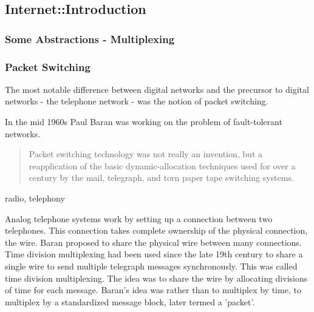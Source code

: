 \subsection{Internet::Introduction}

\subsubsection{Some Abstractions - Multiplexing}

\subsubsection{Packet Switching}

The most notable difference between digital networks and the precursor to digital networks - the
telephone network - was the notion of packet switching.


In the mid 1960s Paul Baran was working on the problem of fault-tolerant networks\cite{baran1964intro}.

\begin{quote}
Packet switching technology was not really an invention, but a reapplication of the basic
    dynamic-allocation techniques used for over a century by the mail, telegraph, and torn paper
    tape switching systems. \cite{roberts1978}
\end{quote}


radio, telephony

Analog telephone systems work by setting up a connection between two telephones. This connection
takes complete ownership of the physical connection, the wire. Baran proposed to share the physical
wire between many connections. Time division multiplexing had been used since the late 19th century
to share a single wire to send multiple telegraph messages synchronously. This was called time
division multiplexing. The idea was to share the wire by allocating divisions of time for each
message. Baran's idea was rather than to multiplex by time, to multiplex by a standardized message
block, later termed a 'packet'.



